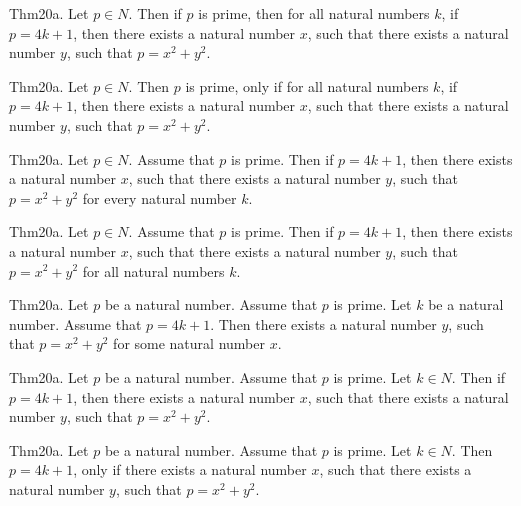 \documentclass{article}
\begin{document}
Thm20a. Let $p \in N$. Then if $p$ is prime, then for all natural numbers $k$, if $p = 4 k + 1$, then there exists a natural number $x$, such that there exists a natural number $y$, such that $p = x ^{ 2}+ y ^{ 2}$.

Thm20a. Let $p \in N$. Then $p$ is prime, only if for all natural numbers $k$, if $p = 4 k + 1$, then there exists a natural number $x$, such that there exists a natural number $y$, such that $p = x ^{ 2}+ y ^{ 2}$.

Thm20a. Let $p \in N$. Assume that $p$ is prime. Then if $p = 4 k + 1$, then there exists a natural number $x$, such that there exists a natural number $y$, such that $p = x ^{ 2}+ y ^{ 2}$ for every natural number $k$.

Thm20a. Let $p \in N$. Assume that $p$ is prime. Then if $p = 4 k + 1$, then there exists a natural number $x$, such that there exists a natural number $y$, such that $p = x ^{ 2}+ y ^{ 2}$ for all natural numbers $k$.

Thm20a. Let $p$ be a natural number. Assume that $p$ is prime. Let $k$ be a natural number. Assume that $p = 4 k + 1$. Then there exists a natural number $y$, such that $p = x ^{ 2}+ y ^{ 2}$ for some natural number $x$.

Thm20a. Let $p$ be a natural number. Assume that $p$ is prime. Let $k \in N$. Then if $p = 4 k + 1$, then there exists a natural number $x$, such that there exists a natural number $y$, such that $p = x ^{ 2}+ y ^{ 2}$.

Thm20a. Let $p$ be a natural number. Assume that $p$ is prime. Let $k \in N$. Then $p = 4 k + 1$, only if there exists a natural number $x$, such that there exists a natural number $y$, such that $p = x ^{ 2}+ y ^{ 2}$.
\end{document}
